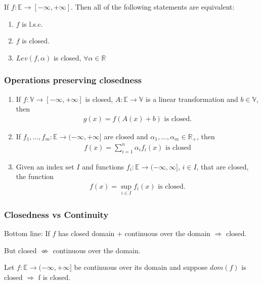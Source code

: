 \documentclass[11pt]{article}
\begin{document}
\begin{theorem}
    If $f:\mathbb{E} \to [-\infty,+\infty]$. Then all of the following statements are equivalent:
    \begin{enumerate}
        \item $f$ is l.s.c.
        \item $f$ is closed.
        \item $Lev(f,\alpha)$ is closed, $\forall \alpha \in \mathbb{R}$
    \end{enumerate}
\end{theorem}

\subsubsection{Operations preserving closedness}
\begin{enumerate}
    \item If $f: \mathbb{V} \to [-\infty,+\infty]$ is closed, $A:\mathbb{E} \to \mathbb{V}$ is a linear transformation
    and $b \in \mathbb{V}$, then 
    \begin{align*}
        g(x) = f(A(x)+b) \text{ is closed.}
    \end{align*}
    \item If $f_1, \ldots ,f_m: \mathbb{E} \to (-\infty,+\infty]$ are closed and $\alpha_1, \ldots ,\alpha_m \in \mathbb{R}_{+}$,
    then 
    \begin{align*}
        f(x) = \sum_{i=1}^{n}\alpha_{i} f_{i}(x) \text{ is closed}
    \end{align*}
    \item Given an index set $I$ and functions $f_i: \mathbb{E} \to (-\infty,\infty]$, $i \in I$,
    that are closed, the function 
    \begin{align*}
        f(x) = \sup_{i \in I} f_{i}(x) \text{ is closed.}
    \end{align*}
\end{enumerate}

\subsubsection{Closedness vs Continuity}
Bottom line: If $f$ has closed domain + continuous over the domain $\Longrightarrow$ closed.

But closed $\not\iff$ continuous over the domain.

\begin{theorem}
    Let $f: \mathbb{E} \to (-\infty,+\infty]$ be continuous over its domain and suppose $dom(f)$ is closed
    $\Longrightarrow$ f is closed.
\end{theorem}
\end{document}
